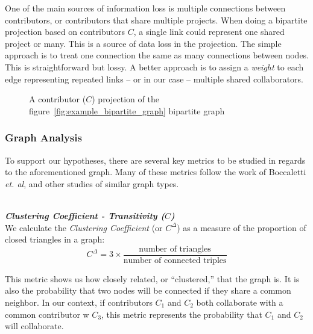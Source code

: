 \documentclass{proc}
\begin{document}
One of the main sources of information loss is multiple connections between contributors, or contributors that share multiple projects. When doing a bipartite projection based on contributors $C$, a single link could represent one shared project or many. This is a source of data loss in the projection. The simple approach is to treat one connection the same as many connections between nodes. This is straightforward but lossy\cite{zhou2007bipartite,grossman1995portion}. A better approach is to assign a \textit{weight} to each edge representing repeated links -- or in our case -- multiple shared collaborators\cite{zha2001bipartite,barrat2004architecture}.

\begin{figure}
\centering
{}
\caption{A contributor ($C$) projection of the figure~\ref{fig:example_bipartite_graph} bipartite graph}
\label{fig:example_bipartite_projection_graph}
\end{figure}

\subsubsection{Graph Analysis}
To support our hypotheses, there are several key metrics to be studied in regards to the aforementioned graph. Many of these metrics follow the work of Boccaletti \textit{et. al}\cite{boccaletti2006complex}, and other studies of similar graph types\cite{latora2001efficient,adamic1999small}.

\noindent\\\textit{\textbf{Clustering Coefficient - Transitivity ($C$)}}\\
We calculate the \textit{Clustering Coefficient} (or $C^\Delta$) as a measure of the proportion of closed triangles in a graph\cite{newman2003structure}:
\[C^\Delta = 3 \times \frac{\text{number of triangles}}
                    {\text{number of connected triples}}\]

This metric shows us how closely related, or ``clustered,'' that the graph is. It is also the probability that two nodes will be connected if they share a common neighbor\cite{newman2003properties}. In our context, if contributors $C_1$ and $C_2$ both collaborate with a common contributor w $C_3$, this metric represents the probability that $C_1$ and $C_2$ will collaborate.
\end{document}
